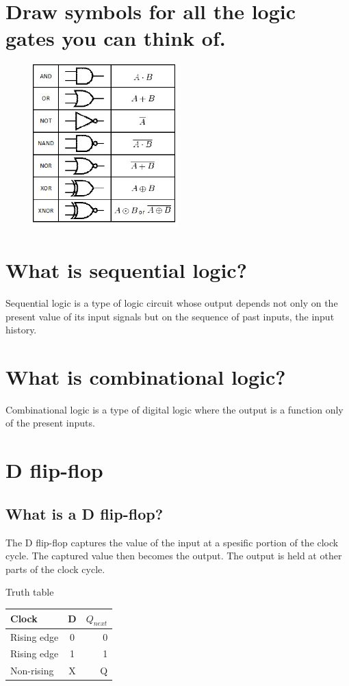 \documentclass{article}
\begin{document}
\section{Draw symbols for all the logic gates you can think of.}
\begin{figure}[hbp]
  \centering
  \includegraphics[width=0.5\textwidth] {images/Logic-gates}
\end{figure}

\section{What is sequential logic?}
Sequential logic is a type of logic circuit whose output depends not
only on the present value of its input signals but on the sequence of
past inputs, the input history.

\section{What is combinational logic?}
Combinational logic is a type of digital logic where the output is a
function only of the present inputs.

\section{D flip-flop}
\subsection{What is a D flip-flop?}
The D flip-flop captures the value of the input at a spesific portion
of the clock cycle. The captured value then becomes the output. The
output is held at other parts of the clock cycle.

Truth table

\begin{tabular}{lcr}
  Clock & D & $Q_{next}$ \\ \hline
  Rising edge & 0 & 0 \\
  Rising edge & 1 & 1 \\
  Non-rising & X & Q \\
\end{tabular}
\end{document}
